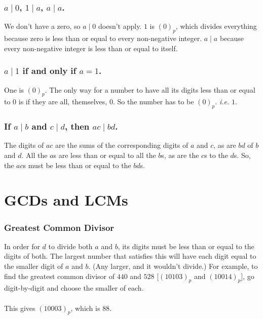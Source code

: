 \documentclass[12pt]{article}
\newcommand{\ppn}[1]{(#1)_p}
\begin{document}
\subsubsection*{$a \mid 0$, $1 \mid a$, $a \mid a$.}
We don't have a zero, so $a \mid 0$ doesn't apply. $1$ is $\ppn{0}$, which divides everything because zero is less than or equal to every non-negative integer. $a \mid a$ because every non-negative integer is less than or equal to itself.

\subsubsection*{$a \mid 1$ if and only if $a = 1$.}
One is $\ppn{0}$. The only way for a number to have all its digits less than or equal to $0$ is if they are all, themselves, $0$. So the number has to be $\ppn{0}$. \textit{i.e.} $1$.

\subsubsection*{If $a \mid b$ and $c \mid d$, then $ac \mid bd$.}
The digits of $ac$ are the sums of the corresponding digits of $a$ and $c$, as are $bd$ of $b$ and $d$. All the $a$s are less than or equal to all the $b$s, as are the $c$s to the $d$s. So, the $ac$s must be less than or equal to the $bd$s.

\section*{GCDs and LCMs}
\subsubsection*{Greatest Common Divisor}
In order for $d$ to divide both $a$ and $b$, its digits must be less than or equal to the digits of both. The largest number that satisfies this will have each digit equal to the smaller digit of $a$ and $b$. (Any larger, and it wouldn't divide.) For example, to find the greatest common divisor of $440$ and $528$ [$\ppn{10103}$ and $\ppn{10014}$], go digit-by-digit and choose the smaller of each.\\
\ttfamily \small
{}
\normalfont \normalsize \\
This gives $\ppn{10003}$, which is $88$.
\end{document}

